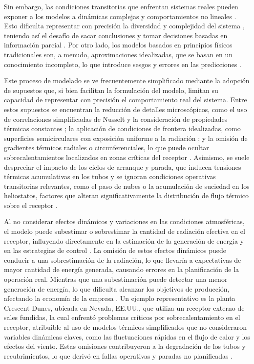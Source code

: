 \documentclass[11pt]{report}
\begin{document}
Sin embargo, las condiciones transitorias que enfrentan sistemas reales pueden exponer a los modelos a dinámicas complejas y comportamientos no lineales \cite{osorio2022forecasting}. Esto dificulta representar con precisión la diversidad y complejidad del sistema \cite{10.1145/3514228}, teniendo así el desafío de sacar conclusiones y tomar decisiones basadas en información parcial \cite{RAISSI2019686}. Por otro lado, los modelos basados en principios físicos tradicionales son, a menudo, aproximaciones idealizadas, que se basan en un conocimiento incompleto, lo que introduce sesgos y errores en las predicciones \cite{10.1145/3514228}. 

Este proceso de modelado se ve frecuentemente simplificado mediante la adopción de supuestos que, si bien facilitan la formulación del modelo, limitan su capacidad de representar con precisión el comportamiento real del sistema. Entre estos supuestos se encuentran la reducción de detalles microscópicos, como el uso de correlaciones simplificadas de Nusselt y la consideración de propiedades térmicas constantes \cite{ahlbrink2009modeling}; la aplicación de condiciones de frontera idealizadas, como superficies semicirculares con exposición uniforme a la radiación \cite{yang2012numerical}; y la omisión de gradientes térmicos radiales o circunferenciales, lo que puede ocultar sobrecalentamientos localizados en zonas críticas del receptor \cite{Li2025}. Asimismo, se suele despreciar el impacto de los ciclos de arranque y parada, que inducen tensiones térmicas acumulativas en los tubos y se ignoran condiciones operativas transitorias relevantes, como el paso de nubes o la acumulación de suciedad en los heliostatos, factores que alteran significativamente la distribución de flujo térmico sobre el receptor \cite{Li2025, picotti2020object}.

Al no considerar efectos dinámicos y variaciones en las condiciones atmosféricas, el modelo puede subestimar o sobrestimar la cantidad de radiación efectiva en el receptor, influyendo directamente en la estimación de la generación de energía y en las estrategias de control \cite{vivanco2019modelacion}. La omisión de estos efectos dinámicos puede conducir a una sobrestimación de la radiación, lo que llevaría a expectativas de mayor cantidad de energía generada, causando errores en la planificación de la operación real. Mientras que una subestimación puede detectar una menor generación de energía, lo que dificulta alcanzar los objetivos de producción, afectando la economía de la empresa \cite{vivanco2019modelacion}. Un ejemplo representativo es la planta Crescent Dunes, ubicada en Nevada, EE.UU., que utiliza un receptor externo de sales fundidas, la cual enfrentó problemas críticos por sobrecalentamiento en el receptor, atribuible al uso de modelos térmicos simplificados que no consideraron variables dinámicas claves, como las fluctuaciones rápidas en el flujo de calor y los efectos del viento. Estas omisiones contribuyeron a la degradación de los tubos y recubrimientos, lo que derivó en fallas operativas y paradas no planificadas \cite{Li2025}. 
\end{document}
